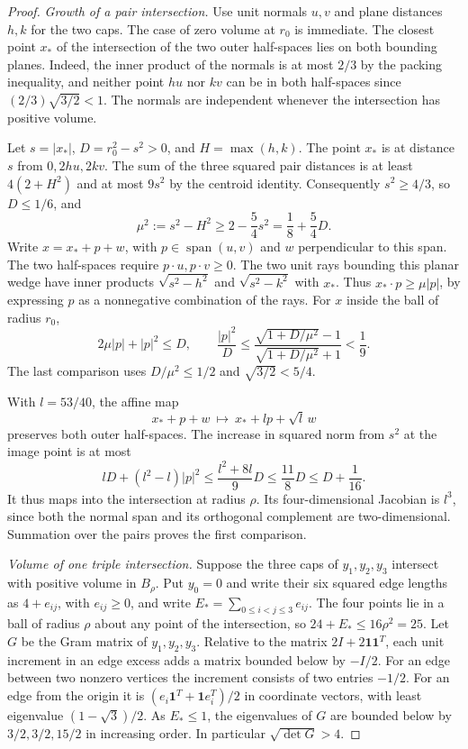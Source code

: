 \begin{proof}
\emph{Growth of a pair intersection.}
Use unit normals \(u,v\) and plane distances \(h,k\) for the
two caps. The case of zero volume at \(r_0\) is immediate.
The closest point \(x_*\) of the intersection of the two outer
half-spaces lies on both bounding planes. Indeed, the inner
product of the normals is at most \(2/3\) by the packing
inequality, and neither point \(hu\) nor \(kv\) can be in both
half-spaces since \((2/3)\sqrt{3/2}<1\). The normals are
independent whenever the intersection has positive volume.

Let \(s=|x_*|\), \(D=r_0^2-s^2>0\), and \(H=\max(h,k)\).
The point \(x_*\) is at distance \(s\) from \(0,2hu,2kv\).
The sum of the three squared pair distances is at least
\(4(2+H^2)\) and at most \(9s^2\) by the centroid identity.
Consequently \(s^2\ge4/3\), so \(D\le1/6\), and
\[
 \mu^2:=s^2-H^2\ge 2-\frac54s^2=\frac18+\frac54D .
\]
Write \(x=x_*+p+w\), with \(p\in\operatorname{span}(u,v)\)
and \(w\) perpendicular to this span. The two half-spaces
require \(p\cdot u,p\cdot v\ge0\). The two unit rays bounding
this planar wedge have inner products \(\sqrt{s^2-h^2}\) and
\(\sqrt{s^2-k^2}\) with \(x_*\). Thus \(x_*\cdot p\ge\mu|p|\),
by expressing \(p\) as a nonnegative combination of the rays.
For \(x\) inside the ball of radius \(r_0\),
\[
 2\mu|p|+|p|^2\le D,\qquad
 \frac{|p|^2}{D}\le
 \frac{\sqrt{1+D/\mu^2}-1}{\sqrt{1+D/\mu^2}+1}<\frac19.
\]
The last comparison uses \(D/\mu^2\le1/2\) and
\(\sqrt{3/2}<5/4\).

With \(l=53/40\), the affine map
\[
 x_*+p+w\ \longmapsto\ x_*+lp+\sqrt l\,w
\]
preserves both outer half-spaces. The increase in squared
norm from \(s^2\) at the image point is at most
\[
 lD+(l^2-l)|p|^2
 \le \frac{l^2+8l}{9}D
 \le\frac{11}{8}D\le D+\frac1{16}.
\]
It thus maps into the intersection at radius \(\rho\).
Its four-dimensional Jacobian is \(l^3\), since both the normal
span and its orthogonal complement are two-dimensional.
Summation over the pairs proves the first comparison.

\emph{Volume of one triple intersection.}
Suppose the three caps of \(y_1,y_2,y_3\) intersect with positive
volume in \(B_\rho\). Put \(y_0=0\) and write their six squared
edge lengths as \(4+e_{ij}\), with \(e_{ij}\ge0\), and write
\(E_*=\sum_{0\le i<j\le3}e_{ij}\). The four points lie in a
ball of radius \(\rho\) about any point of the intersection,
so \(24+E_*\le16\rho^2=25\). Let \(G\) be the Gram matrix of
\(y_1,y_2,y_3\). Relative to the matrix \(2I+2\mathbf1\mathbf1^T\),
each unit increment in an edge excess adds a matrix bounded
below by \(-I/2\). For an edge between two nonzero vertices the
increment consists of two entries \(-1/2\). For an edge from
the origin it is
\((e_i\mathbf1^T+\mathbf1 e_i^T)/2\) in coordinate vectors,
with least eigenvalue \((1-\sqrt3)/2\).
As \(E_*\le1\), the eigenvalues of \(G\) are bounded below
by \(3/2,3/2,15/2\) in increasing order. In particular
\(\sqrt{\det G}>4\).


\end{proof}
